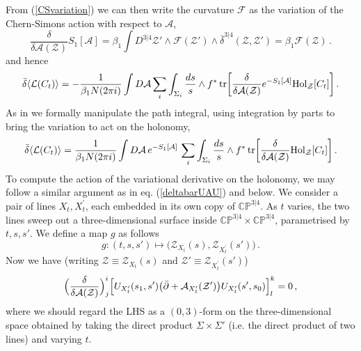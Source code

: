 \documentclass[12pt]{article}
\def \be  {\begin{equation}}
\def \ee  {\end{equation}}
\def \tr {\mathop{\rm tr}\nolimits}
\numberwithin{equation}{section}
\begin{document}
From (\ref{CSvariation}) we can then write the curvature $\mathcal{F}$ as the variation of the Chern-Simons action with respect to $\mathcal{A}$,
\be
\frac{\delta}{\delta \mathcal{A}(\mathcal{Z})} S_1 [\mathcal{A}] =  \beta_1 \int D^{3|4}\mathcal{Z}' \wedge \mathcal{F}(\mathcal{Z}') \wedge \bar{\delta}^{3|4}(\mathcal{Z},\mathcal{Z}') =  \beta_1 \mathcal{F}(\mathcal{Z})\,.
\ee
and hence
\be
\bar{\delta} \langle \mathcal{L}(C_t)\rangle = -\frac{1}{\beta_1 N (2 \pi i)} \int D \mathcal{A}  \sum_i \int_{\Sigma_i} \frac{ds}{s} \wedge  f^* \tr \biggl[  \frac{\delta}{\delta \mathcal{A}(\mathcal{Z})} e^{-S_1[\mathcal{A}]} {\rm Hol}_{\mathcal{Z}}[C_t]\biggr] \,.
\label{FVariation}
\ee
As in \cite{Makeenko:1979pb,Bullimore:2011ni} we formally manipulate the path integral, using integration by parts to bring the variation to act on the holonomy,
\be
\bar{\delta} \langle \mathcal{L}(C_t)\rangle = \frac{1}{\beta_1 N (2 \pi i)} \int D \mathcal{A} \, e^{-S_1[\mathcal{A}]}\, \sum_i \int_{\Sigma_i} \frac{ds}{s} \wedge  f^*  \tr \biggl[   \frac{\delta}{\delta \mathcal{A}(\mathcal{Z})}{\rm Hol}_{\mathcal{Z}}[C_t]\biggr] \,.
\ee
To compute the action of the variational derivative on the holonomy, we may follow a similar argument as in eq. (\ref{deltabarUAU}) and below. We consider a pair of lines $X_t, X^\prime_t$, each embedded in its own copy of $\mathbb{CP}^{3|4}$. As $t$ varies, the two lines sweep out a three-dimensional surface inside $\mathbb{CP}^{3|4} \times \mathbb{CP}^{3|4}$, parametrised by $t,s,s'$. We define a map $g$ as follows
\be
g: (t,s,s') \mapsto \bigl(\mathcal{Z}_{X_t}(s),\mathcal{Z}_{X^\prime_t}(s')\bigr)\,.
\ee
Now we have (writing $\mathcal{Z} \equiv \mathcal{Z}_{X_t}(s)$ and $\mathcal{Z}' \equiv \mathcal{Z}_{X^\prime_t}(s')$)
\be
\Bigl(\frac{\delta}{\delta \mathcal{A}(\mathcal{Z})}\Bigr)^i_j  \Bigl[U_{X^\prime_t}(s_1,s')\bigl(\bar{\partial} + \mathcal{A}_{X^\prime_t}(\mathcal{Z}')\bigr)U_{X^\prime_t}(s',s_0)\Bigr]^k_l = 0\,,
\ee
where we should regard the LHS as a $(0,3)$-form on the three-dimensional space obtained by taking the direct product $\Sigma \times \Sigma'$ (i.e. the direct product of two lines) and varying $t$. 
\end{document}
